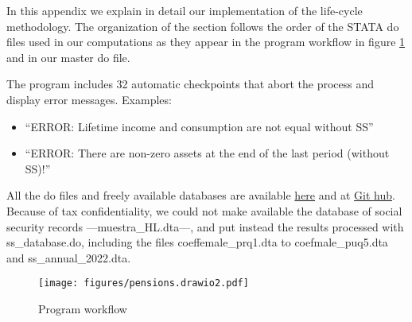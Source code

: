 \documentclass{article}
\begin{document}
In this appendix we explain in detail our implementation of the life-cycle methodology. The organization of the section follows the order of the STATA do files used in our computations as they appear in the program workflow in figure \ref{figure:workflow} and in our master do file. 

The program includes 32 automatic checkpoints that abort the process and display error messages. Examples: 
\begin{itemize}
    \item``ERROR: Lifetime income and consumption are not equal without SS''
    \item ``ERROR: There are non-zero assets at the end of the last period (without SS)!''
\end{itemize}

All the do files and freely available databases are available \href{https://drive.google.com/drive/u/0/folders/17_zXXRNoAxP0-d2TTHoPJQhRDLQGbpNb}{here} and at  \href{https://github.com/alforteza/Redistributive-effects-of-pensions}{Git hub}. Because of tax confidentiality, we could not make available the database of social security records ---muestra\_HL.dta---, and put instead the results processed with ss\_database.do, including the files coeffemale\_prq1.dta to coefmale\_puq5.dta and ss\_annual\_2022.dta. 


\begin{figure} 
    \centering
    \caption{Program workflow}
\texttt{[image: figures/pensions.drawio2.pdf]}  
\label{figure:workflow}
\end{figure}


\begin{comment}
 
\end{comment}
 
\end{document}
